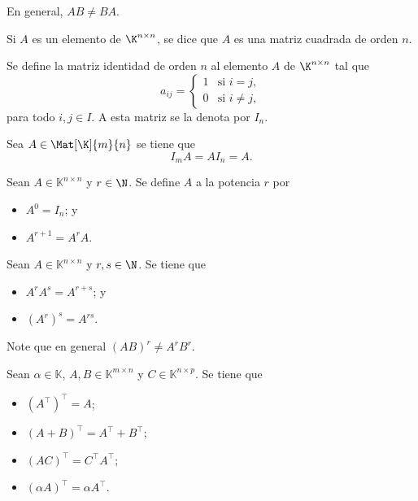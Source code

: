 \documentclass[a4,11pt]{aleph-notas}
\begin{document}
\begin{advertencia}
    En general, $AB\neq BA$.
\end{advertencia}

\begin{defi}
    Si $A$ es un elemento de $\K^{n \times n}$, se dice que $A$ es una matriz cuadrada de orden $n$. 
\end{defi}

\begin{defi}
    Se define la matriz identidad de orden $n$ al elemento $A$ de $\K^{n \times n}$ tal que
    \[
        a_{ij} =
            \begin{cases}
            1 & \text{si } i=j, \\
            0 & \text{si } i \neq j,
            \end{cases}
    \]
    para todo $i,j\in I$. A esta matriz se la denota por $I_n$.
\end{defi} 

\begin{prop}
    Sea $A\in\Mat[\K]{m}{n}$ se tiene que
    \[ 
        I_m A = A I_n = A.
    \]
\end{prop}

\begin{defi}
    Sean $A \in \mathbb{K}^{n \times n}$ y $r\in\N$. Se define $A$ a la potencia $r$ por
    \begin{itemize}
    \item 
        $A^0 = I_n$; y
    \item 
        $A^{r+1} = A^rA$.
    \end{itemize}
\end{defi}

\begin{teo}
    Sean $A \in \mathbb{K}^{n \times n}$ y $r,s\in\N$. Se tiene que
    \begin{itemize}
    \item 
        $A^r A^s = A^{r+s}$; y 
    \item 
        $(A^r)^s = A^{rs}$.
    \end{itemize}
\end{teo}

\begin{advertencia}
    Note que en general $(AB)^r \neq A^r B^r$.
\end{advertencia}


\begin{teo}
    Sean $\alpha \in \mathbb{K}$, $A,B\in\mathbb{K}^{m \times n}$ y  $C\in\mathbb{K}^{n \times p}$. Se tiene que
    \begin{itemize}
    \item 
        $\left(A^\intercal\right)^\intercal = A$;
    \item 
        $(A+B)^\intercal = A^\intercal + B^\intercal$;
    \item 
        $(AC)^\intercal = C^\intercal A^\intercal$;
    \item 
        $(\alpha A)^\intercal = \alpha A^\intercal$.
    \end{itemize}
\end{teo}
\end{document}
